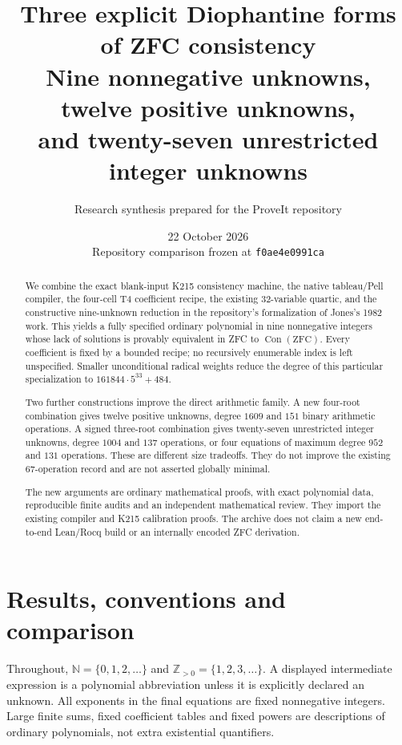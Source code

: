\documentclass[11pt,a4paper]{article}
\title{\textbf{Three explicit Diophantine forms\\of ZFC consistency}\\[6pt]
 \large Nine nonnegative unknowns, twelve positive unknowns,\\
 and twenty-seven unrestricted integer unknowns}
\author{Research synthesis prepared for the ProveIt repository}
\date{22 October 2026\\[3pt]\small Repository comparison frozen at \texttt{f0ae4e0991ca}}
\theoremstyle{remark}
\newcommand{\NN}{\mathbb N}
\newcommand{\ZZ}{\mathbb Z}
\newcommand{\Con}{\operatorname{Con}}
\newcommand{\ZFC}{\mathrm{ZFC}}
\begin{document}
\maketitle
\begin{abstract}
We combine the exact blank-input K215 consistency machine, the native
tableau/Pell compiler, the four-cell T4 coefficient recipe, the existing
32-variable quartic, and the constructive nine-unknown reduction in the
repository's formalization of Jones's 1982 work.  This yields a fully
specified ordinary polynomial in nine nonnegative integers whose lack of
solutions is provably equivalent in ZFC to $\Con(\ZFC)$.  Every coefficient
is fixed by a bounded recipe; no recursively enumerable index is left
unspecified.  Smaller unconditional radical weights reduce the degree of
this particular specialization to $161844\cdot5^{33}+484$.

Two further constructions improve the direct arithmetic family.  A new
four-root combination gives twelve positive unknowns, degree $1609$ and
$151$ binary arithmetic operations.  A signed three-root combination gives
twenty-seven unrestricted integer unknowns, degree $1004$ and $137$
operations, or four equations of maximum degree $952$ and $131$
operations.  These are different size tradeoffs.  They do not improve the
existing $67$-operation record and are not asserted globally minimal.

The new arguments are ordinary mathematical proofs, with exact polynomial
data, reproducible finite audits and an independent mathematical review.
They import the existing compiler and K215 calibration proofs.  The archive
does not claim a new end-to-end Lean/Rocq build or an internally encoded
ZFC derivation.
\end{abstract}

\clearpage
\begingroup
\small
\setlength{\parskip}{0pt}
\tableofcontents
\endgroup
\clearpage

\section{Results, conventions and comparison}
\label{sec:results}

Throughout, $\NN=\{0,1,2,\ldots\}$ and
$\ZZ_{>0}=\{1,2,3,\ldots\}$.  A displayed intermediate expression is a
polynomial abbreviation unless it is explicitly declared an unknown.
All exponents in the final equations are fixed nonnegative integers.
Large finite sums, fixed coefficient tables and fixed powers are
descriptions of ordinary polynomials, not extra existential quantifiers.
\end{document}
